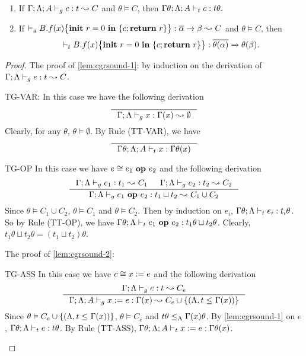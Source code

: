 {{{\begin{lemma}
\begin{enumerate}[label={(\alph*)}]
\item\label{lem:cgrsound-2} If $\Gamma;\Lambda; A \vdash_{g} c : t\leadsto C$ and $\theta \vDash C$,
then  $\Gamma\theta;\Lambda;A \vdash_{t} c : t\theta.$

\item\label{lem:cgrsound-3} If $ \vdash_{g} {B.f}(x)\big\{{{\textbf{init}~ {r}=0 ~\textbf{in}~\{{c};\textbf{return}~{r}\}}}\big\} :  \overline{\alpha}\rightarrow \beta\leadsto C$ and $\theta \vDash C$, then
\[
\vdash_{t} {B.f}(x)\big\{{{\textbf{init}~ {r}=0 ~\textbf{in}~\{{c};\textbf{return}~{r}\}}}\big\} : \overline{\theta(\alpha)}\xrightarrow{}\theta(\beta).
\]

\end{enumerate}
\end{lemma}

\begin{proof}
The proof of \ref{lem:cgrsound-1}: by induction on the derivation of $\Gamma;\Lambda \vdash_{g} e : t\leadsto C$. %
\begin{ProofEnumDesc}
\item[TG-VAR:] In this case we have the following derivation
\begin{equation*}
\inference{}
{\Gamma;\trace\vdash_{g} x : \Gamma(x)\leadsto \emptyset}
\end{equation*}
Clearly, for any $\theta$, $\theta \vDash \emptyset$.
By Rule {(TT-VAR)}, we have
\begin{equation*}
\inference{}
{\Gamma\theta;\trace; A \vdash_{t} \leVAR{x} : \Gamma\theta(x)}
\end{equation*}

\item[TG-OP] In this case we have $e \cong {e_1}~\textbf{op}~{e_2}$ and the following derivation
\begin{equation*}
\inference
{\Gamma;\trace \vdash_{g} e_1: t_1 \leadsto C_1 &
 \Gamma;\trace \vdash_{g} e_2: t_2 \leadsto C_2}
{\Gamma;\trace \vdash_{g} \leOP{e_1}{e_2} : t_1\sqcup t_2\leadsto C_1\cup C_2}
\end{equation*}
Since $\theta \vDash C_1\cup C_2$, $\theta\vDash C_1$ and $\theta\vDash C_2$.
Then by induction on $e_i$, $\Gamma\theta;\Lambda \vdash_{t} e_i: t_i\theta$.
So by Rule {(TT-OP)}, we have $\Gamma\theta;\Lambda \vdash_{t} {e_1}~\textbf{op}~{e_2}: t_1\theta\sqcup t_2\theta $.
Clearly, $t_1\theta\sqcup t_2\theta = (t_1\sqcup t_2)\theta$.
\end{ProofEnumDesc}
The proof of \ref{lem:cgrsound-2}:%
\begin{ProofEnumDesc}
\item[TG-ASS] In this case we have $c \cong {x}:={e}$ and the following derivation
\begin{equation*}
\inference
{\Gamma;\trace \vdash_{g} e : t \leadsto C_{e} }
{\Gamma;\trace; A \vdash_{g} \lcASS{x}{e} : \Gamma(x)\leadsto C_{e}\cup \{ (\trace, t \leq_{} \Gamma(x))\} }
\end{equation*}
Since $\theta\vDash C_{e}\cup \{ (\Lambda, t \leq_{} \Gamma(x))\}$,
$\theta\vDash C_{e}$ and $t\theta \leq_{\Lambda} \Gamma(x)\theta $.
By \ref{lem:cgrsound-1} on $e$, $\Gamma\theta;\Lambda \vdash_{t} e : t \theta$.
By Rule {(TT-ASS)}, $\Gamma\theta;\Lambda; A \vdash_{t} x := e : \Gamma\theta(x)$.


\end{ProofEnumDesc}
\end{proof}}}}
